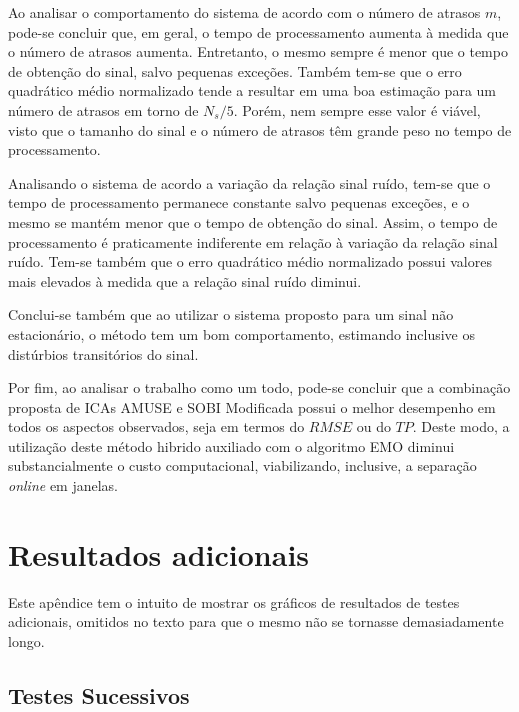 \documentclass[a4paper,12pt]{monografia}
\theoremstyle{plain}
\theoremstyle{definition}
\theoremstyle{remark}
\begin{document}
Ao analisar o comportamento do sistema de acordo com o número de atrasos $m$, pode-se concluir que, em geral, o tempo de processamento aumenta à medida que o número de atrasos aumenta. Entretanto, o mesmo sempre é menor que o tempo de obtenção do sinal, salvo pequenas exceções. Também tem-se que o erro quadrático médio normalizado tende a resultar em uma boa estimação para um número de atrasos em torno de $N_s/5$. Porém, nem sempre esse valor é viável, visto que o tamanho do sinal e o número de atrasos têm grande peso no tempo de processamento. 

Analisando o sistema de acordo a variação da relação sinal ruído, tem-se que o tempo de processamento permanece constante salvo pequenas exceções, e o mesmo se mantém menor que o tempo de obtenção do sinal. Assim, o tempo de processamento é praticamente indiferente em relação à variação da relação sinal ruído. Tem-se também que o erro quadrático médio normalizado possui valores mais elevados à medida que a relação sinal ruído diminui.

Conclui-se também que ao utilizar o sistema proposto para um sinal não estacionário, o método tem um bom comportamento, estimando inclusive os distúrbios transitórios do sinal.

Por fim, ao analisar o trabalho como um todo, pode-se concluir que a combinação proposta de ICAs AMUSE e SOBI Modificada possui o melhor desempenho em todos os aspectos observados, seja em termos do $RMSE$ ou do $TP$. Deste modo, a utilização deste método hibrido auxiliado com o algoritmo EMO diminui substancialmente o custo computacional, viabilizando, inclusive, a separação \textit{online} em janelas.  


\singlespacing



\appendix
\chapter{Resultados adicionais}

Este apêndice tem o intuito de mostrar os gráficos de resultados de testes adicionais, omitidos no texto para que o mesmo não se tornasse demasiadamente longo.

\section{Testes Sucessivos}
\end{document}

